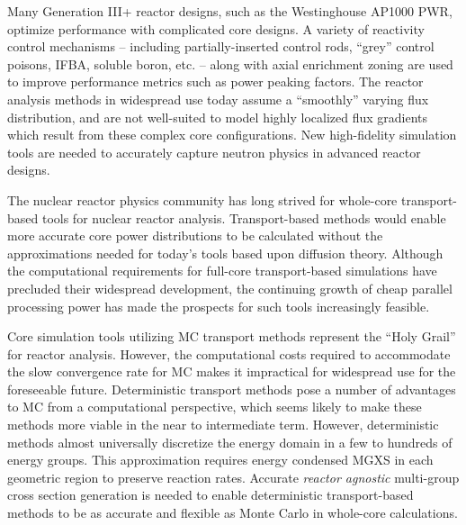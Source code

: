 Many Generation III+ reactor designs, such as the Westinghouse AP1000 \ac{PWR}, optimize performance with complicated core designs. A variety of reactivity control mechanisms -- including partially-inserted control rods, ``grey'' control poisons, \ac{IFBA}, soluble boron, etc. -- along with axial enrichment zoning are used to improve performance metrics such as power peaking factors. The reactor analysis methods in widespread use today assume a ``smoothly'' varying flux distribution, and are not well-suited to model highly localized flux gradients which result from these complex core configurations. New high-fidelity simulation tools are needed to accurately capture neutron physics in advanced reactor designs.


The nuclear reactor physics community has long strived for whole-core transport-based tools for nuclear reactor analysis. Transport-based methods would enable more accurate core power distributions to be calculated without the approximations needed for today’s tools based upon diffusion theory. Although the computational requirements for full-core transport-based simulations have precluded their widespread development, the continuing growth of cheap parallel processing power has made the prospects for such tools increasingly feasible.


Core simulation tools utilizing \ac{MC} transport methods represent the ``Holy Grail'' for reactor analysis. However, the computational costs required to accommodate the slow convergence rate for \ac{MC} makes it impractical for widespread use for the foreseeable future. Deterministic transport methods pose a number of advantages to \ac{MC} from a computational perspective, which seems likely to make these methods more viable in the near to intermediate term. However, deterministic methods almost universally discretize the energy domain in a few to hundreds of energy groups. This approximation requires energy condensed \ac{MGXS} in each geometric region to preserve reaction rates. Accurate \emph{reactor agnostic} multi-group cross section generation is needed to enable deterministic transport-based methods to be as accurate and flexible as Monte Carlo in whole-core calculations.

